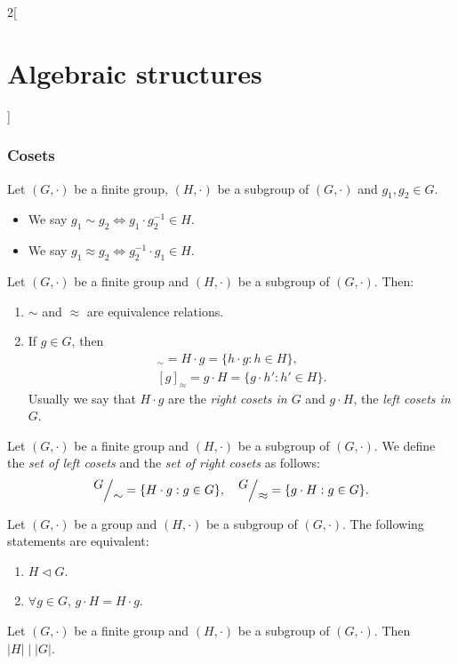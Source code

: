 \documentclass[class=article,10pt,crop=false]{standalone}
\begin{document}
\begin{multicols}{2}[\section{Algebraic structures}]
\subsubsection*{Cosets}
\begin{definition}\label{AS_equiv} 
Let $(G,\cdot)$ be a finite group, $(H,\cdot)$ be a subgroup of $(G,\cdot)$ and $g_1,g_2\in G$. 
\begin{itemize}
    \item We say $g_1\sim g_2\iff g_1\cdot g_2^{-1}\in H$.
    \item We say $g_1\approx g_2\iff g_2^{-1}\cdot g_1\in H$.
\end{itemize}
\end{definition}
\begin{lemma}
Let $(G,\cdot)$ be a finite group and $(H,\cdot)$ be a subgroup of $(G,\cdot)$. Then:
\begin{enumerate}
    \item $\sim$ and $\approx$ are equivalence relations.
    \item If $g\in G$, then 
    \begin{gather*}
        [g]_\sim=H\cdot g=\{h\cdot g:h\in H\},\\ [g]_\approx=g\cdot H=\{g\cdot h':h'\in H\}.
    \end{gather*}
    Usually we say that $H\cdot g$ are the \textit{right cosets in $G$} and $g\cdot H$, the \textit{left cosets in $G$}. 
\end{enumerate}
\end{lemma}
\begin{definition}
Let $(G,\cdot)$ be a finite group and $(H,\cdot)$ be a subgroup of $(G,\cdot)$. We define the \textit{set of left cosets} and the \textit{set of right cosets} as follows:
$$\quot{G}{\sim}=\{H\cdot g:g\in G\},\quad\quot{G}{\approx}=\{g\cdot H:g\in G\}.$$
\end{definition}
\begin{prop}
Let $(G,\cdot)$ be a group and $(H,\cdot)$ be a subgroup of $(G,\cdot)$. The following statements are equivalent:
\begin{enumerate}
    \item $H\lhd G$.
    \item $\forall g\in G$, $g\cdot H=H\cdot g$.
\end{enumerate}
\end{prop}
\begin{theorem}
Let $(G,\cdot)$ be a finite group and $(H,\cdot)$ be a subgroup of $(G,\cdot)$. Then $|H|\mid|G|$.
\end{theorem}

\end{multicols}
\end{document}
